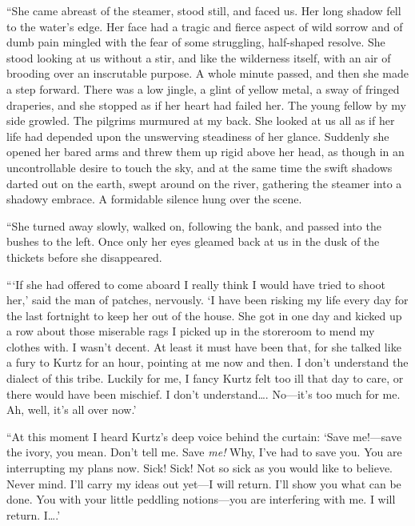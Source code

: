 \documentclass[12pt]{report}
\begin{document}
``She came abreast of the steamer, stood still, and faced us. Her long
shadow fell to the water's edge. Her face had a tragic and fierce aspect
of wild sorrow and of dumb pain mingled with the fear of some
struggling, half-shaped resolve. She stood looking at us without a stir,
and like the wilderness itself, with an air of brooding over an
inscrutable purpose. A whole minute passed, and then she made a step
forward. There was a low jingle, a glint of yellow metal, a sway of
fringed draperies, and she stopped as if her heart had failed her. The
young fellow by my side growled. The pilgrims murmured at my back. She
looked at us all as if her life had depended upon the unswerving
steadiness of her glance. Suddenly she opened her bared arms and threw
them up rigid above her head, as though in an uncontrollable desire to
touch the sky, and at the same time the swift shadows darted out on the
earth, swept around on the river, gathering the steamer into a shadowy
embrace. A formidable silence hung over the scene.

``She turned away slowly, walked on, following the bank, and passed into
the bushes to the left. Once only her eyes gleamed back at us in the
dusk of the thickets before she disappeared.

```If she had offered to come aboard I really think I would have tried
to shoot her,' said the man of patches, nervously. `I have been risking
my life every day for the last fortnight to keep her out of the house.
She got in one day and kicked up a row about those miserable rags I
picked up in the storeroom to mend my clothes with. I wasn't decent. At
least it must have been that, for she talked like a fury to Kurtz for an
hour, pointing at me now and then. I don't understand the dialect of
this tribe. Luckily for me, I fancy Kurtz felt too ill that day to care,
or there would have been mischief. I don't understand\ldots{}. No---it's
too much for me. Ah, well, it's all over now.'

``At this moment I heard Kurtz's deep voice behind the curtain: `Save
me!---save the ivory, you mean. Don't tell me. Save \emph{me!} Why, I've
had to save you. You are interrupting my plans now. Sick! Sick! Not so
sick as you would like to believe. Never mind. I'll carry my ideas out
yet---I will return. I'll show you what can be done. You with your
little peddling notions---you are interfering with me. I will return.
I\ldots{}.'
\end{document}
